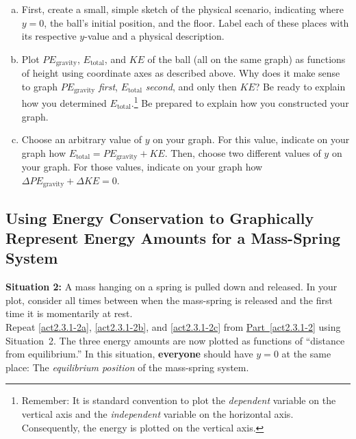 \begin{enumerate}[(a)]
	\item	\label{act2.3.1-2a} First, create a small, simple sketch of the physical scenario, indicating where $y = 0$, the ball's initial position, and the floor. Label each of these places with its respective $y$-value and a physical description.
	\item	\label{act2.3.1-2b} Plot $PE_\text{gravity}$, $E_\text{total}$, and $KE$ of the ball (all on the same graph) as functions of height using coordinate axes as described above. Why does it make sense to graph $PE_\text{gravity}$ {\em first}, $E_\text{total}$ {\em second}, and only then $KE$? Be ready to explain how you determined $E_\text{total}$.\footnote{Remember: It is standard convention to plot the \emph{dependent} variable on the vertical axis and the \emph{independent} variable on the horizontal axis. Consequently, the energy is plotted on the vertical axis.} Be prepared to explain how you constructed your graph.
	\item	\label{act2.3.1-2c} Choose an arbitrary value of $y$ on your graph. For this value, indicate on your graph how $E_\text{total} = PE_\text{gravity} + KE$. Then, choose two different values of $y$ on your graph. For those values, indicate on your graph how $\Delta PE_\text{gravity} + \Delta KE = 0$.
\end{enumerate}

\WCD


\subsection{Using Energy Conservation to Graphically Represent Energy Amounts for a Mass-Spring System}
\label{SpringMassActivity}

\textbf{Situation 2:} A mass hanging on a spring is pulled down and released. In your plot, consider all times between when the mass-spring is released and the first time it is momentarily at rest.\\
	
\noindent Repeat \eqref{act2.3.1-2a}, \eqref{act2.3.1-2b}, and \eqref{act2.3.1-2c} from \hyperref[act2.3.1-2]{Part~\ref*{act2.3.1-2}} using Situation~2. The three energy amounts are now plotted as functions of ``distance from equilibrium.'' In this situation, \textbf{everyone} should have $y = 0$ at the same place: The \emph{equilibrium position} of the mass-spring system.

\WCD